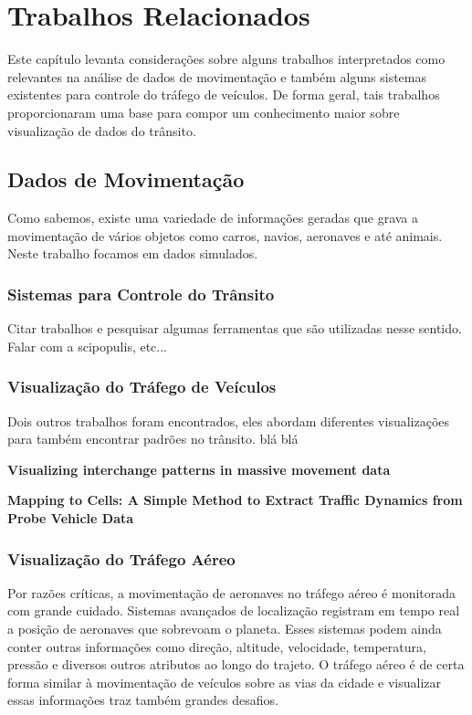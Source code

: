 \chapter{Trabalhos Relacionados}
\label{cap:trabalhos-relacionados}

Este capítulo levanta considerações sobre alguns trabalhos interpretados como
relevantes na análise de dados de movimentação e também alguns sistemas existentes
para controle do tráfego de veículos. De forma geral, tais trabalhos proporcionaram uma base
para compor um conhecimento maior sobre visualização de dados do trânsito.

\section{Dados de Movimentação}
Como sabemos, existe uma variedade de informações geradas que grava a movimentação
de vários objetos como carros, navios, aeronaves e até animais. Neste trabalho
focamos em dados simulados.

\subsection{Sistemas para Controle do Trânsito}

Citar trabalhos e pesquisar algumas ferramentas que são utilizadas nesse sentido.
Falar com a scipopulis, etc... 

\subsection{Visualização do Tráfego de Veículos}

Dois outros trabalhos foram encontrados, eles abordam diferentes visualizações
para também encontrar padrões no trânsito. blá blá

\textbf{Visualizing interchange patterns in massive movement data}

\textbf{Mapping to Cells: A Simple Method to Extract Traffic Dynamics from Probe Vehicle Data}

\subsection{Visualização do Tráfego Aéreo}

  Por razões críticas, a movimentação de aeronaves no tráfego aéreo é monitorada
  com grande cuidado. Sistemas avançados de localização registram em tempo real
  a posição de aeronaves que sobrevoam o planeta. Esses sistemas podem ainda
  conter outras informações como direção, altitude, velocidade, temperatura, pressão
  e diversos outros atributos ao longo do trajeto. O tráfego aéreo é de certa
  forma similar à movimentação de veículos sobre as vias da cidade e visualizar
  essas informações traz também grandes desafios.

